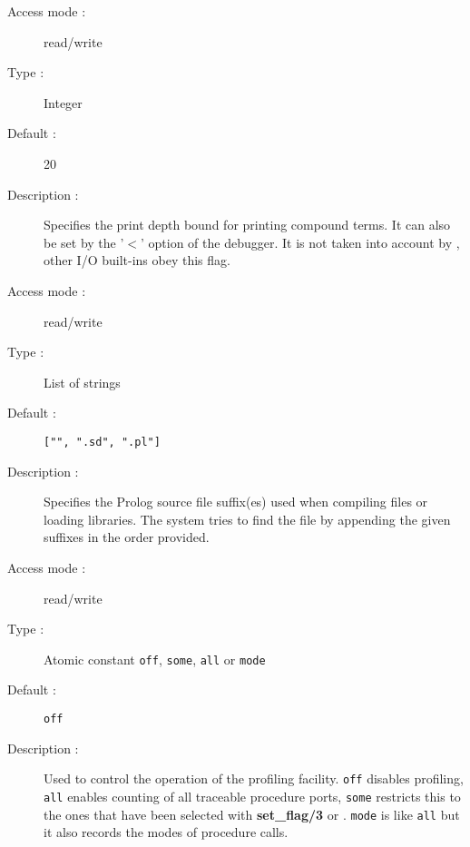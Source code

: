 \begin{description}
\begin{description}
\item[Access mode : ] read/write
\item[Type : ] Integer
\item[Default : ] 20
\item[Description : ] Specifies the print depth bound for printing
compound terms. It can also be set by the '$<$' option of the debugger.
It is not taken into account by ,
other I/O built-ins obey this flag.
\end{description}

\begin{description}
\item[Access mode : ] read/write
\item[Type : ] List of strings
\item[Default : ] {\tt ["", ".sd", ".pl"]}
\item[Description : ] Specifies the Prolog source file suffix(es) used when
compiling files or loading libraries.
The system tries to find the file by appending
the given suffixes in the order provided.
\end{description}

\begin{description}
\item[Access mode : ] read/write
\item[Type : ] Atomic constant {\tt off}, {\tt some}, {\tt all} or {\tt mode}
\item[Default : ] {\tt off}
\item[Description : ] Used to control the operation of the profiling facility.
{\tt off} disables profiling, {\tt all} enables counting of all traceable
procedure ports, {\tt some} restricts this to the ones that have been
selected with {\bf set_flag/3} or . {\tt mode} is like
{\tt all} but it also records the modes of procedure calls.
\end{description}


\end{description}
